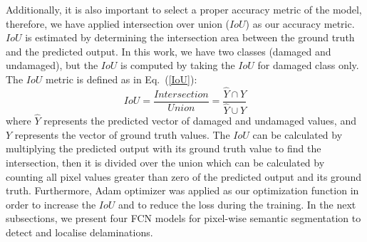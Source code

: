 Additionally, it is also important to select a proper accuracy metric of the model, therefore, we have applied intersection over union (\(IoU\)) as our accuracy metric. 
\(IoU\) is estimated by determining the intersection area between the ground truth and the predicted output.
In this work, we have two classes (damaged and undamaged), but the \(IoU\) is computed by taking the \(IoU\) for damaged class only.
The \(IoU\) metric is defined as in Eq.~(\ref{IoU}):
\begin{equation}
IoU = \frac{Intersection}{Union} = \frac{\hat{Y} \cap Y}{\hat{Y} \cup Y} 
\label{IoU}
\end{equation}
where \(\hat{Y}\) represents the predicted vector of damaged and undamaged values, and \(Y\) represents the vector of ground truth values.
The \(IoU\) can be calculated by multiplying the predicted output with its ground truth value to find the intersection, then it is divided over the union which can be calculated by counting all pixel values greater than zero of the predicted output and its ground truth.
Furthermore, Adam optimizer was applied as our optimization function in order to increase the \(IoU\) and to reduce the loss during the training.
In the next subsections, we present four FCN models for pixel-wise semantic segmentation to detect and localise delaminations.